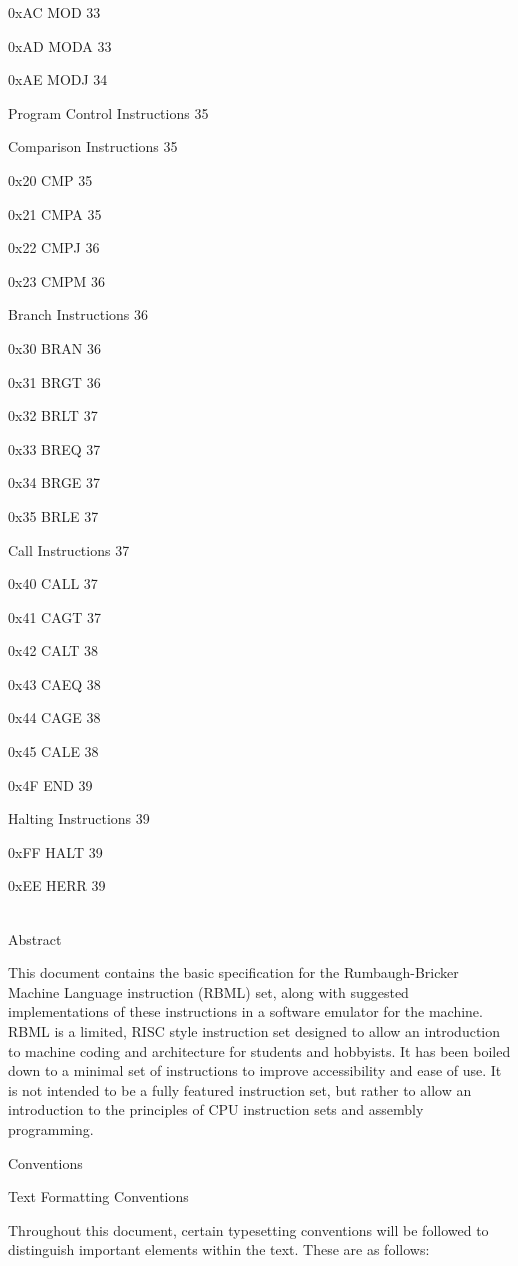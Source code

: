 \documentclass[]{article}
\begin{document}
0xAC MOD 33

0xAD MODA 33

0xAE MODJ 34

Program Control Instructions 35

Comparison Instructions 35

0x20 CMP 35

0x21 CMPA 35

0x22 CMPJ 36

0x23 CMPM 36

Branch Instructions 36

0x30 BRAN 36

0x31 BRGT 36

0x32 BRLT 37

0x33 BREQ 37

0x34 BRGE 37

0x35 BRLE 37

Call Instructions 37

0x40 CALL 37

0x41 CAGT 37

0x42 CALT 38

0x43 CAEQ 38

0x44 CAGE 38

0x45 CALE 38

0x4F END 39

Halting Instructions 39

0xFF HALT 39

0xEE HERR 39

\textbf{}\\

Abstract

This document contains the basic specification for the Rumbaugh-Bricker
Machine Language instruction (RBML) set, along with suggested
implementations of these instructions in a software emulator for the
machine. RBML is a limited, RISC style instruction set designed to allow
an introduction to machine coding and architecture for students and
hobbyists. It has been boiled down to a minimal set of instructions to
improve accessibility and ease of use. It is not intended to be a fully
featured instruction set, but rather to allow an introduction to the
principles of CPU instruction sets and assembly programming.

Conventions

Text Formatting Conventions

Throughout this document, certain typesetting conventions will be
followed to distinguish important elements within the text. These are as
follows:
\end{document}
